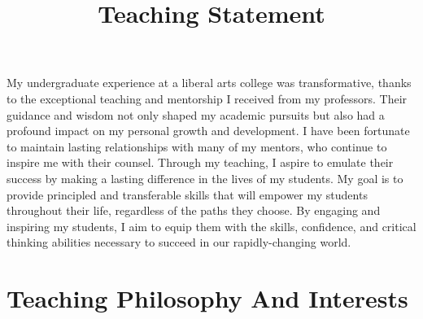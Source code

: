 \documentclass[11pt,a4paper,sans]{moderncv} %
\title{Teaching Statement}
\begin{document}
\makecvtitle %

\setlength\parskip{8px}

My undergraduate experience at a liberal arts college was transformative, thanks to the exceptional teaching and mentorship I received from my professors. 
Their guidance and wisdom not only shaped my academic pursuits but also had a profound impact on my personal growth and development. 
I have been fortunate to maintain lasting relationships with many of my mentors, who continue to inspire me with their counsel. 
Through my teaching, I aspire to emulate their success by making a lasting difference in the lives of my students. 
My goal is to provide principled and transferable skills that will empower my students throughout their life, regardless of the paths they choose. 
By engaging and inspiring my students, I aim to equip them with the skills, confidence, and critical thinking abilities necessary to succeed in our rapidly-changing world.

\section{Teaching Philosophy And Interests}
\end{document}

